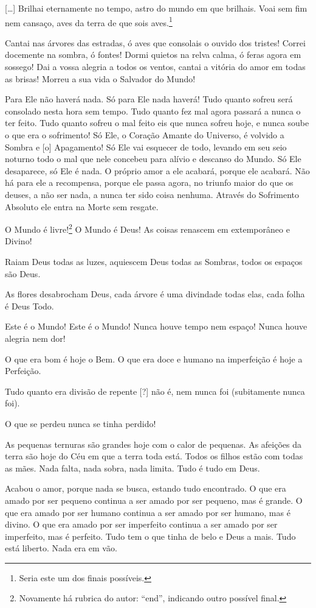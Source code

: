 \bigskip

[\ldots{}] Brilhai eternamente no tempo, astro do mundo em que brilhais. Voai sem
fim nem cansaço, aves da terra de que sois aves.\footnote{Seria este
um dos finais possíveis.}

\repl{[Coro]} Cantai nas árvores das estradas, ó aves que consolais o
ouvido dos tristes! Correi
docemente na sombra, ó fontes! Dormi quietos na relva calma, ó feras
agora em sossego! Dai a vossa alegria a todos os ventos, cantai a
vitória do amor em todas as brisas! Morreu a sua vida o Salvador do
Mundo!  

Para Ele não haverá nada. Só para Ele nada haverá! Tudo quanto sofreu
será consolado nesta hora sem tempo. Tudo quanto fez mal agora
passará a nunca o ter feito. Tudo quanto sofreu o mal feito eis que
nunca sofreu hoje, e nunca soube o que era o sofrimento! Só Ele, o
Coração Amante do Universo, é volvido a Sombra e [o] Apagamento! Só
Ele vai esquecer de todo, levando em seu seio noturno todo o mal que
nele concebeu para alívio e descanso do Mundo. Só Ele desaparece, só
Ele é nada. O próprio amor a ele acabará, porque ele acabará. Não há
para ele a recompensa, porque ele passa agora, no triunfo maior do
que os deuses, a não ser nada, a nunca ter sido coisa nenhuma.
Através do Sofrimento Absoluto ele entra na Morte sem resgate.

O Mundo é livre!\footnote{ Novamente há rubrica do autor: “end”,
indicando outro possível final.} O Mundo é Deus! As coisas renascem
em extemporâneo e Divino!

Raiam Deus todas as luzes, aquiescem Deus todas as Sombras, todos os
espaços são Deus.

As flores desabrocham Deus, cada árvore é uma divindade todas elas,
cada folha é Deus Todo.

Este é o Mundo! Este é o Mundo! Nunca houve tempo nem espaço! Nunca
houve alegria nem dor!

O que era bom é hoje o Bem. O que era doce e humano na imperfeição é
hoje a Perfeição.

Tudo quanto era divisão de repente [?] não é, nem nunca foi
(subitamente nunca foi).

O que se perdeu nunca se tinha perdido!

As pequenas ternuras são grandes hoje com o calor de pequenas. As
afeições da terra são hoje do Céu em que a terra toda está. Todos os
filhos estão com todas as mães. Nada falta, nada sobra, nada limita.
Tudo é tudo em Deus.

 Acabou o amor,
porque nada se busca, estando tudo encontrado. O que era amado por
ser pequeno continua a ser amado por ser pequeno, mas é grande. O que
era amado por ser humano continua a ser amado por ser humano, mas é
divino. O que era amado por ser imperfeito continua a ser amado por
ser imperfeito, mas é perfeito. Tudo tem o que tinha de belo e Deus a
mais. Tudo está liberto. Nada era em vão.

\endgroup

